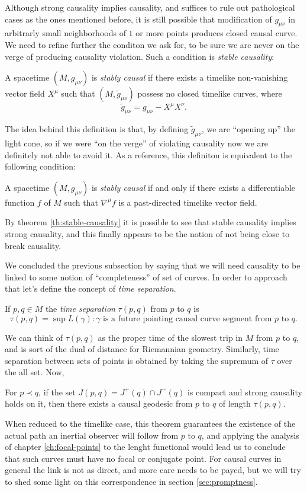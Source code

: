 	Although strong causality implies causality, and suffices to rule out pathological cases as the ones mentioned before, it is still possible that modification of \(g_{\mu\nu}\) in arbitrarly small neighborhoods of \(1\) or more points produces closed causal curve. We need to refine further the conditon we ask for, to be sure we are never on the verge of producing causality violation. Such a condition is \emph{stable causality}:
	\begin{definition}
		A spacetime \((M, g_{\mu\nu})\) is \emph{stably causal} if there exists a timelike non-vanishing vector field \(X^{\mu}\) such that \((M, \tilde{g}_{\mu\nu})\) possess no closed timelike curves, where
		\[
			\tilde{g}_{\mu\nu}= g_{\mu\nu} - X^{\mu}X^{\nu}.
		\]
	\end{definition}
	The idea behind this definition is that, by defining \(\tilde{g}_{\mu\nu}\), we are ``opening up'' the light cone, so if we were ``on the verge'' of violating causality now we are definitely not able to avoid it. As a reference, this definiton is equivalent to the following condition:
	\begin{theorem}
		\label{th:stable-causality}
		A spacetime \((M, g_{\mu\nu})\) is \emph{stably causal} if and only if there exists a differentiable function \(f\) of \(M\) such that \(\nabla^{\mu}f\) is a past-directed timelike vector field.
	\end{theorem}
By theorem \ref{th:stable-causality} it is possible to see that stable causality implies strong causality, and this finally appears to be the notion of not being close to break causality.

We concluded the previous subsection by saying that we will need causality to be linked to some notion of ``completeness'' of set of curves. In order to approach that let's define the concept of \emph{time separation}.
\begin{definition}
	If \(p,q\in M\) the \emph{time separation} \(\tau (p,q)\) from \(p\) to \(q\) is
	\[
		\tau (p,q) = \sup{L(\gamma): \gamma\text{ is a future pointing causal curve segment from } p \text{ to } q}.
	\]
\end{definition}
We can think of \(\tau (p,q)\) as the proper time of the slowest trip in \(M\) from \(p\) to \(q\), and is sort of the dual of distance for Riemannian geometry.
Similarly, time separation between sets of points is obtained by taking the supremum of \(\tau\) over the all set. Now,
\begin{prop}
	\label{prop:global-existence}
	For \(p \prec q\), if the set \(J(p, q) = J^+(q) \cap J^-(q)\) is compact and strong causality holds on it, then there exists a causal geodesic from \(p\) to \(q\) of length \(\tau (p,q)\).
\end{prop}
When reduced to the timelike case, this theorem guarantees the existence of the actual path an inertial observer will follow from \(p\) to \(q\), and applying the analysis of chapter \ref{ch:focal-points} to the lenght functional would lead us to conclude that such curves must have no focal or conjugate point. For causal curves in general the link is not as direct, and more care needs to be payed, but we will try to shed some light on this correspondence in section \ref{sec:promptness}.

